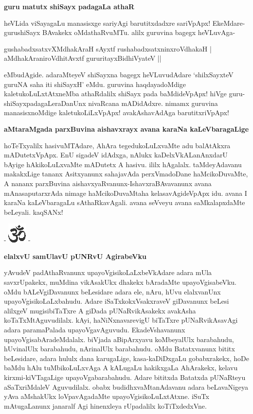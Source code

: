 {\bigskip
\noindent
{\large\bf guru matutx shiSayx padagaLa athaR}}\label{page190}
\medskip

\noindent
heVLida viSayagaLu manasisxge sariyAgi barutitxdadxre sariVpApx! EkeMdare- gurushiSayx BAvakekx oMdathaR\-vuMTu. alilx guruvina bagegx heVLuvAga-

\begin{shloka}
gushabadxsatxvXMdhakAraH sAyxtf rushabadxsatxninxroVdhakaH |\\\label{190}
aMdhakAraniroVdhitAvxtf gururitayxBidhiVyateV ||
\end{shloka}

\noindent
eMbudAgide. adaraMteyeV shiSayxna bagegx heVLuvudAdare `shilxSayxteV guruNA saha iti shiSayxH'\label{190} eMdu. guru\-vina haqdayadoMdige kaletukoLuLxtAtxneMba athaRdalilx shiSayx pada baMdideVpApx! hiVge guru- shiSayxpada\-gaLeraDanUnx nivaRcana mADidAdxre. nimamx guruvina manasisxnoMdige kaletukoLiLxVpApx! avakAshavAdAga barutitxriVpApx!

{\bigskip
\noindent
{\large\bf aMtaraMgada parxBuvina aishavxrayx avana karaNa kaLeVbaragaLige}}\label{page190}
\medskip

\noindent
hoTeTxyalilx hasivuMTAdare, AhAra tegedukoLuLxvaMte adu balAtAkxra mADutetxVpApx. EnU sigadeV idAdxga, nAlukx kaDelxVkALanAnxdarU bAyige hAkikoLuLxvaMte mADutetx A hasivu. ililx hAga\-lalx. taMdeyAdavanu makakxLige tananx Asitxyanunx sahajavAda perxVmadoDane haMcikoDuvaMte, A nananx parxBuvina aishavxyaRvanunx-IshavxraBAvavanunx avana mAnasaputarxrAda nimage haMcikoDuvaMtaha kelasavA\-gideVpApx idu. avana I karaNa kaLeVbaragaLu sAthaRkavAgali. avana seVveyu avana saMkalapxdaMte beLeyali. kaqSANx!

\newpage

\begin{center}
- \includegraphics{om.eps} -
\end{center}

{\bigskip
\noindent
{\large\bf elalxvU samUlavU pUNRvU AgirabeVku}}\label{page190}
\medskip

\noindent
yAvudeV padAthaRvanunx upayoVgisikoLaLxbeVkAdare adara mUla savxrUpakekx, muMdina vikA\-sakUkx dhakekx bAradaMte upayoVgisabeVku. oMdu bALeVgiDavanunx beLesidare adara ele, nAru, hUvu elalx\-vanUnx upayoVgisikoLaLxbahudu. Adare iSaTxkokxVsakxraveV giDavanunx beLesi alilxgeV mugisibiTaTxre A giDada pUNaRvikAsakekx avakAsha koTaTxMtAguvudilalx. kAyi, haNiNxnavarevigU biTaTxre pUNaRvikAsa\-vAgi adara paramaPalada upayoVgavAguvudu. EkadeVshavanunx upayoVgisabAradeMdalalx. biVjada aBipArxyavu koMbeyalUlx barabahudu, hUvinalUlx barabahudu, nArinalUlx barabahudu. oMdu Batatxvanunx bititx beLesidare, adara hululx dana karugaLige, kasa-kaDiDxgaLu gobabxrakekx, hoDe baMdu hAlu tuMbikoLuLxvAga A kALugaLu hakikxgaLa AhArakekx, kelavu kirxmi-kiVTagaLige upayoVgabarabahudu. Adare bititxda Batatxda pUNaRteyu aSaTxriMdaleV Aguvudilalx. obabx budidhxvaMtanAdavanu adara beLavaNigeya yAva aMshakUkx loVpavAgadaMte upayoVgisikoLuLxtAtxne. iSuTx mAtugaLanunx janaralf Agi hinenx\-leya rUpadalilx koTiTxdedxVne.

